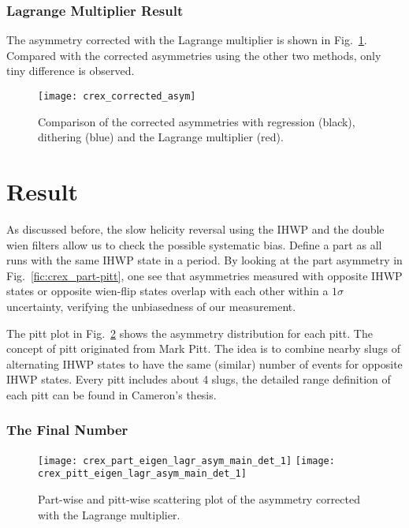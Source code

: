 \subsubsection{Lagrange Multiplier Result}
The asymmetry corrected with the Lagrange multiplier is shown in 
Fig.~\ref{fig:crex_corrected_asym}. Compared with the corrected asymmetries using
the other two methods, only tiny difference is observed.
\begin{figure}[!h]
    \centering
    \texttt{[image: crex\_corrected\_asym]}
    \caption{Comparison of the corrected asymmetries with regression (black), 
    dithering (blue) and the Lagrange multiplier (red).}
    \label{fig:crex_corrected_asym}
\end{figure}

\section{Result}
As discussed before, the slow helicity reversal using the IHWP and the 
double wien filters allow us to check the possible systematic bias. 
Define a part as all runs with the same IHWP state in a period. 
By looking at the part asymmetry in Fig.~\ref{fic:crex_part-pitt}, 
one see that asymmetries measured with 
opposite IHWP states or opposite wien-flip states overlap
with each other within a $1\sigma$ uncertainty, verifying the unbiasedness of our
measurement.

The pitt plot in Fig.~\ref{fig:crex_part_pitt} shows the asymmetry distribution
for each pitt. The concept of pitt originated from Mark Pitt. The idea is to combine
nearby slugs of alternating IHWP states to have the same (similar) number of events for 
opposite IHWP states. Every pitt includes about 4 slugs, the detailed range definition
of each pitt can be found in Cameron's thesis.

\subsubsection{The Final Number}
\begin{figure}
    \centering
    \texttt{[image: crex\_part\_eigen\_lagr\_asym\_main\_det\_1]}
    \texttt{[image: crex\_pitt\_eigen\_lagr\_asym\_main\_det\_1]}
    \caption{Part-wise and pitt-wise scattering plot of the asymmetry 
    corrected with the Lagrange multiplier.}
    \label{fig:crex_part_pitt}
\end{figure}

